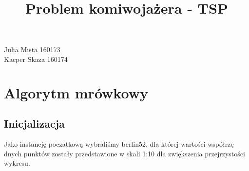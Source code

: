 \documentclass{article}
\title{Problem komiwojażera - TSP}
\date{}
\begin{document}
\maketitle

\begin{flushleft}
	Julia Mista 160173\\
	Kacper Skaza 160174
\end{flushleft}

\section{Algorytm mrówkowy}
\subsection{Inicjalizacja}
Jako instancję poczatkową wybraliśmy berlin52, dla której wartości współrzę
dnych punktów zostały przedstawione w skali 1:10 dla zwiększenia przejrzystości wykresu.
\newline
\newline
\newline
\end{document}
